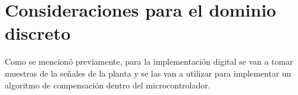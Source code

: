 %
%
%
%
%


\section{Consideraciones para el dominio discreto}\label{consideraciones_sistemas_discretos}

Como se mencionó previamente, para la implementación digital se van a tomar muestras de la señales de la planta y se las van a utilizar para implementar un algoritmo de compensación dentro del microcontrolador. 

